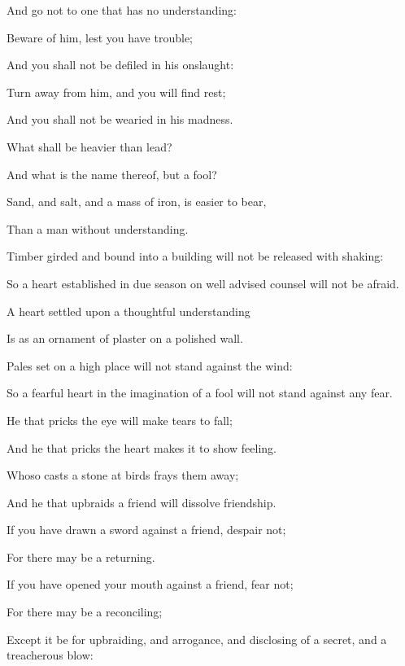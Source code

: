 {\par }{\Q And go not to one that has no understanding:
\par }{\Q Beware of him, lest you have trouble;
\par }{\Q And
{} you shall not be
 defiled in his onslaught:
\par }{\Q Turn away from him, and you will find rest;
\par }{\Q And
{} you shall not be wearied in his madness.
\par }{\Q {}What shall be heavier than lead?
\par }{\Q And what is the name thereof, but a fool?
\par }{\Q {}Sand, and salt, and a mass of iron, is easier to bear,
\par }{\Q Than a man without understanding.
\par }{\BB \par }{\Q {}Timber girded and bound into a building will not be released with shaking:
\par }{\Q So a heart established in due season on well advised counsel will not be afraid.
\par }{\Q {}A heart settled upon a thoughtful understanding
\par }{\Q Is as an ornament of plaster on a polished wall.
\par }{\Q {}Pales set on a high place will not stand against the wind:
\par }{\Q So a fearful heart in the imagination of a fool will not stand against any fear.
\par }{\BB \par }{\Q {}He that pricks the eye will make tears to fall;
\par }{\Q And he that pricks the heart makes it to show feeling.
\par }{\Q {}Whoso casts a stone at birds frays them away;
\par }{\Q And he that upbraids a friend will dissolve friendship.
\par }{\Q {}If you have drawn a sword against a friend, despair not;
\par }{\Q For there may be a returning.
\par }{\Q {}If you have opened your mouth against a friend, fear not;
\par }{\Q For there may be a reconciling;
\par }{\Q Except it be for upbraiding, and arrogance, and disclosing of a secret, and a treacherous blow:
}
